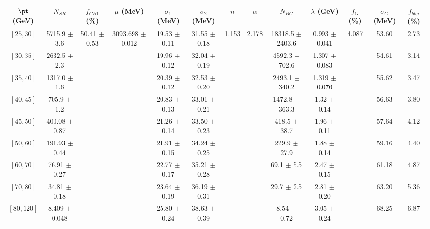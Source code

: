 \begin{tabular}{c||c|c|c|c|c|c|c|c|c|c|c||c}
$\pt$ (GeV) & $N_{SR}$ & $f_{CB1}$ (\%) & $\mu$ (MeV) & $\sigma_1$ (MeV) & $\sigma_2$ (MeV) & $n$ & $\alpha$ & $N_{BG}$ & $\lambda$ (GeV) & $f_G$ (\%) & $\sigma_G$ (MeV) & $f_{bkg}$ (\%) \\
\hline
$[25, 30]$ & 5715.9 $\pm$ 3.6 & \multirow{9}{*}{50.41 $\pm$ 0.53} & \multirow{9}{*}{3093.698 $\pm$ 0.012} & 19.53 $\pm$ 0.11 & 31.55 $\pm$ 0.18 & \multirow{9}{*}{1.153} & \multirow{9}{*}{2.178} & 18318.5 $\pm$ 2403.6 & 0.993 $\pm$ 0.041 & \multirow{9}{*}{4.087} & 53.60 & 2.73\\
$[30, 35]$ & 2632.5 $\pm$ 2.3 &  &  & 19.96 $\pm$ 0.12 & 32.04 $\pm$ 0.19 &  &  & 4592.3 $\pm$ 702.6 & 1.307 $\pm$ 0.083 &  & 54.61 & 3.14\\
$[35, 40]$ & 1317.0 $\pm$ 1.6 &  &  & 20.39 $\pm$ 0.12 & 32.53 $\pm$ 0.20 &  &  & 2493.1 $\pm$ 340.2 & 1.319 $\pm$ 0.076 &  & 55.62 & 3.47\\
$[40, 45]$ & 705.9 $\pm$ 1.2 &  &  & 20.83 $\pm$ 0.13 & 33.01 $\pm$ 0.21 &  &  & 1472.8 $\pm$ 363.3 & 1.32 $\pm$ 0.14 &  & 56.63 & 3.80\\
$[45, 50]$ & 400.08 $\pm$ 0.87 &  &  & 21.26 $\pm$ 0.14 & 33.50 $\pm$ 0.23 &  &  & 418.5 $\pm$ 38.7 & 1.96 $\pm$ 0.11 &  & 57.64 & 4.12\\
$[50, 60]$ & 191.93 $\pm$ 0.44 &  &  & 21.91 $\pm$ 0.15 & 34.24 $\pm$ 0.25 &  &  & 229.9 $\pm$ 27.9 & 1.88 $\pm$ 0.14 &  & 59.16 & 4.40\\
$[60, 70]$ & 76.91 $\pm$ 0.27 &  &  & 22.77 $\pm$ 0.17 & 35.21 $\pm$ 0.28 &  &  & 69.1 $\pm$ 5.5 & 2.47 $\pm$ 0.15 &  & 61.18 & 4.87\\
$[70, 80]$ & 34.81 $\pm$ 0.18 &  &  & 23.64 $\pm$ 0.19 & 36.19 $\pm$ 0.31 &  &  & 29.7 $\pm$ 2.5 & 2.81 $\pm$ 0.20 &  & 63.20 & 5.36\\
$[80, 120]$ & 8.409 $\pm$ 0.048 &  &  & 25.80 $\pm$ 0.24 & 38.63 $\pm$ 0.39 &  &  & 8.54 $\pm$ 0.72 & 3.05 $\pm$ 0.24 &  & 68.25 & 6.87\\
\end{tabular}
